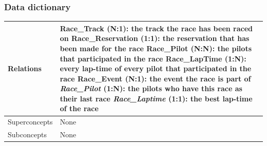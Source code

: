 \documentclass{beamer}
\begin{document}
\begin{frame}
\frametitle{Data dictionary}
\begin{table}
\tiny
\begin{tabular}{|p{2cm}|p{6cm}|}
\hline
Relations & 
Race\_Track (N:1): the track the race has been raced on \newline
Race\_Reservation (1:1): the reservation that has been made for the race \newline
Race\_Pilot (N:N): the pilots that participated in the race \newline
Race\_LapTime (1:N): every lap-time of every pilot that participated in the race \newline
Race\_Event (N:1): the event the race is part of \newline
\textit{Race\_Pilot} (1:N): the pilots who have this race as their last race \newline
\textit{Race\_Laptime} (1:1): the best lap-time of the race \\
\hline
Superconcepts & None \\
\hline
Subconcepts & None \\
\hline
\end{tabular}
\end{table}
\end{frame}
\end{document}
